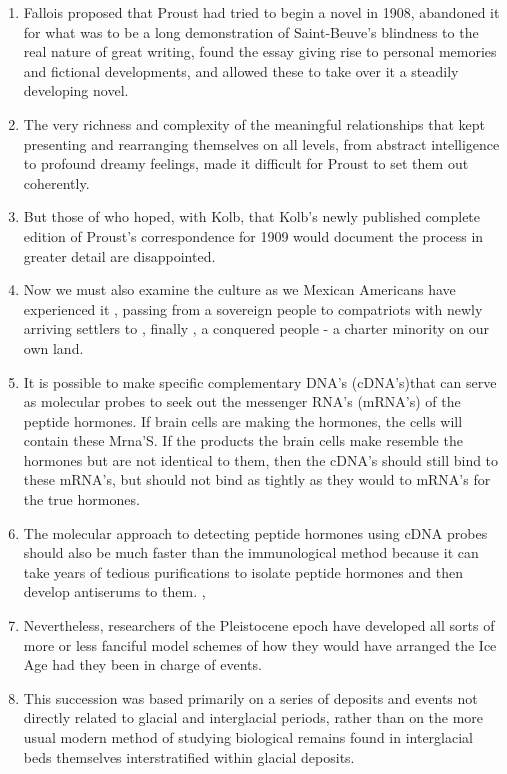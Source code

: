 \begin{enumerate}
\item Fallois proposed that Proust had tried to begin a novel in 1908, abandoned it for what was to be a long demonstration of Saint-Beuve's blindness to the real nature of great writing, found the essay giving rise to personal memories and fictional developments, and allowed these to take over it a steadily developing novel. 

\item The very richness and complexity of the meaningful relationships that
kept presenting and rearranging themselves on all levels, from abstract intelligence to profound dreamy feelings,  made it difficult for Proust to set them out coherently.

\item But those of who hoped, with Kolb, that Kolb's newly published complete edition of Proust's correspondence for 1909 would document the process in greater detail are disappointed. 

\item Now we must also examine the culture as we Mexican Americans have experienced it , passing from a sovereign people to compatriots with newly arriving settlers to , finally , a conquered people - a charter minority on our own land. 

\item It is possible to make specific complementary DNA's (cDNA's)that can serve as molecular probes to seek out the messenger RNA's (mRNA's) of the peptide hormones. If brain cells are making the hormones, the cells will contain these Mrna'S. If the products the brain cells make resemble the hormones but are not identical to them, then the cDNA's should still bind to  these mRNA's, but should not bind as tightly as they would to mRNA's for the true hormones.

\item The molecular approach to detecting peptide hormones using cDNA probes should also be much faster than the immunological method because it can take years of tedious purifications  to isolate peptide hormones and then develop antiserums to them. , 

\item Nevertheless, researchers of the Pleistocene epoch have developed all
sorts of more or less fanciful model schemes of how they would have arranged the Ice Age had they been in charge of events.

\item This succession was based primarily on a series of deposits and events not directly related to  glacial and interglacial periods, rather than on the more usual modern method of studying biological remains found in interglacial beds themselves interstratified within glacial deposits.


\end{enumerate}
